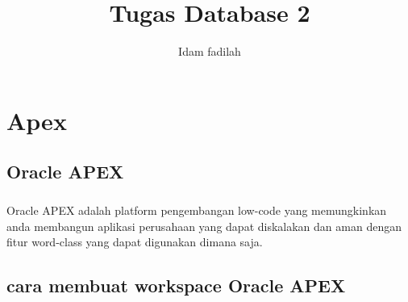 \documentclass[a4paper,12pt]{report}
\title{Tugas Database 2}
\author{Idam fadilah}
\begin{document}
\maketitle
\chapter{Apex}
\section*{Oracle APEX}
\paragraph{}
Oracle APEX adalah platform pengembangan low-code yang memungkinkan anda membangun aplikasi perusahaan yang dapat diskalakan dan aman dengan fitur word-class yang dapat digunakan dimana saja.

\section*{cara membuat workspace Oracle APEX}
\end{document}
